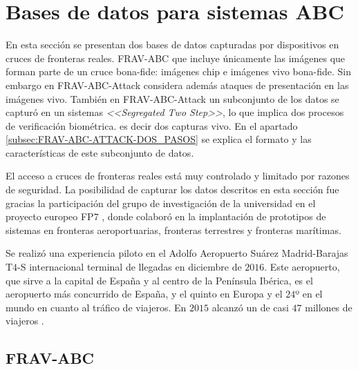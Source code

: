 \section{Bases de datos para sistemas ABC}\label{sec:BBDD-ABC}

En esta sección se presentan dos bases de datos capturadas por dispositivos  en cruces de fronteras reales. \Gls{FRAV-ABC} que incluye únicamente las imágenes que forman parte de un cruce \gls{bona-fide}: imágenes \gls{chip} e imágenes \gls{vivo bona-fide}. Sin embargo en \Gls{FRAV-ABC-Attack} considera además ataques de presentación en las imágenes \gls{vivo}. También en \Gls{FRAV-ABC-Attack} un subconjunto de los datos se capturó en un sistemas  \textit{<<Segregated Two Step>>}, lo que implica dos procesos de verificación biométrica. es decir dos capturas \gls{vivo}. En el apartado \ref{subsec:FRAV-ABC-ATTACK-DOS_PASOS} se explica el formato y las características de este subconjunto de datos.

El acceso a cruces de fronteras reales está muy controlado y limitado por razones de seguridad. La posibilidad de capturar los datos descritos en esta sección fue gracias la participación del grupo de investigación  de la universidad  en el proyecto europeo FP$7$ , donde colaboró en la implantación de prototipos de sistemas  en fronteras aeroportuarias, fronteras terrestres y fronteras marítimas.

Se realizó una experiencia piloto en el Adolfo Aeropuerto Suárez Madrid-Barajas T$4$-S internacional terminal de llegadas en diciembre de $2016$. Este aeropuerto, que sirve a la capital de España y al centro de la Península Ibérica, es el aeropuerto más concurrido de España, y el quinto en Europa y el $24$º en el mundo en cuanto al tráfico de viajeros. En $2015$ alcanzó un de casi $47$ millones de viajeros \cite{ACI2016}.

\subsection{FRAV-ABC}\label{subsec:FRAV-ABC}


